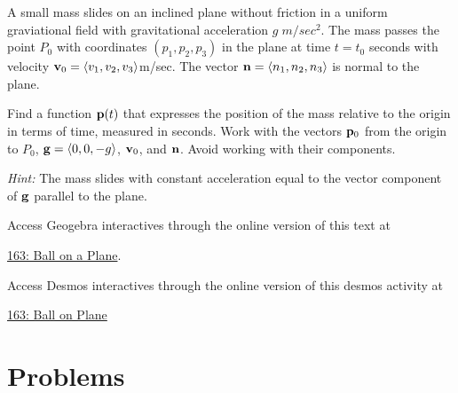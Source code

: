 \documentclass{ximera}
\begin{document}
\begin{question}  \label{Qefd46365}
A small mass slides on an inclined plane without friction in a uniform graviational field with gravitational acceleration $g \;  m/sec^2$. The mass passes the point $P_0$ with coordinates $(p_1, p_2, p_3 )$ in the plane at time $t=t_0$ seconds with velocity ${\bf v}_0 = \langle v_1, v_2, v_3 \rangle$m/sec.  The vector ${\bf n} =\langle n_1, n_2, n_3\rangle$ is normal to the plane.

Find a function ${\bf p}(t)$ that expresses the position of the mass relative to the origin in terms of time, measured in seconds. Work with the vectors ${\bf p}_0$ from the origin to $P_0$, ${\bf g} = \langle 0, 0, -g \rangle$, ${\bf v}_0$, and ${\bf n}$. Avoid working with their components.

{\it Hint:}  The mass slides with constant acceleration equal to the vector component of ${\bf g}$ parallel to the plane.




\begin{exploration}
\begin{onlineOnly}
    \begin{center}
\end{center}
\end{onlineOnly}


Access Geogebra interactives through the online version of this text at

 
\href{https://www.geogebra.org/classic/rcmapxuh}{163: Ball on a Plane}.

Access Desmos interactives through the online version of this desmos activity at

\href{https://www.desmos.com/3d/07057c1762}{163: Ball on Plane}


\end{exploration}

\end{question}


\section{Problems}
\end{document}
